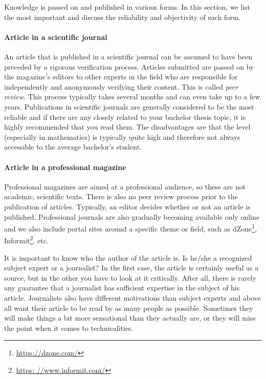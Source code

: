 Knowledge is passed on and published in various forms. In this section, we list the most important and discuss the reliability and objectivity of each form.

\paragraph{Article in a scientific journal}

An article that is published in a scientific journal can be assumed to have been preceded by a rigorous verification process. Articles submitted are passed on by the magazine's editors to other experts in the field who are responsible for independently and anonymously verifying their content. This is called \emph{peer review}. This process typically takes several months and can even take up to a few years. Publications in scientific journals are generally considered to be the most reliable and if there are any closely related to your bachelor thesis topic, it is highly recommended that you read them. The disadvantages are that the level (especially in mathematics) is typically quite high and therefore not always accessible to the average bachelor's student.

\paragraph{Article in a professional magazine}

Professional magazines are aimed at a professional audience, so these are not academic, scientific texts. There is also no peer review process prior to the publication of articles. Typically, an editor decides whether or not an article is published. Professional journals are also gradually becoming available only online and we also include portal sites around a specific theme or field, such as dZone\footnote{\url{https://dzone.com/}}, Informit\footnote{\url{https: //www.informit.com/}}, etc.

It is important to know who the author of the article is. Is he/she a recognized subject expert or a journalist? In the first case, the article is certainly useful as a source, but in the other you have to look at it critically. After all, there is rarely any guarantee that a journalist has sufficient expertise in the subject of his article. Journalists also have different motivations than subject experts and above all want their article to be read by as many people as possible. Sometimes they will make things a bit more sensational than they actually are, or they will miss the point when it comes to technicalities.
